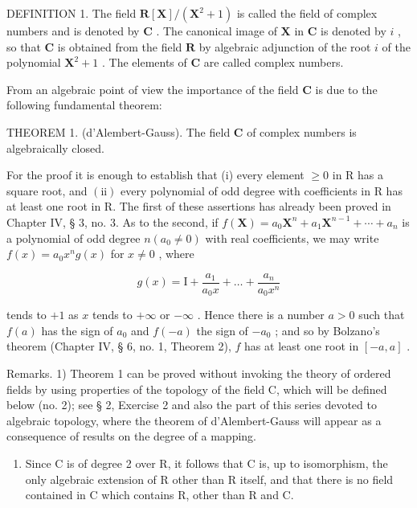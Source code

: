 DEFINITION 1. The field \(\mathbf{R}[\mathbf{X}] / (\mathbf{X}^2 + 1)\) is called the field of complex numbers and is denoted by \(\mathbf{C}\) . The canonical image of \(\mathbf{X}\) in \(\mathbf{C}\) is denoted by \(i\) , so that \(\mathbf{C}\) is obtained from the field \(\mathbf{R}\) by algebraic adjunction of the root \(i\) of the polynomial \(\mathbf{X}^2 + 1\) . The elements of \(\mathbf{C}\) are called complex numbers.

From an algebraic point of view the importance of the field \(\mathbf{C}\) is due to the following fundamental theorem:

THEOREM 1. (d'Alembert-Gauss). The field \(\mathbf{C}\) of complex numbers is algebraically closed.

For the proof it is enough to establish that (i) every element \(\geqslant0\) in R has a square root, and \((\mathrm{ii})\) every polynomial of odd degree with coefficients in R has at least one root in R. The first of these assertions has already been proved in Chapter IV, § 3, no. 3. As to the second, if \(f(\mathbf{X}) = a_{0}\mathbf{X}^{n} + a_{1}\mathbf{X}^{n-1} + \cdots + a_{n}\) is a polynomial of odd degree \(n(a_{0} \neq 0)\) with real coefficients, we may write \(f(x) = a_{0}x^{n}g(x)\) for \(x \neq 0\) , where

\[
g (x) = \mathrm{I} + \frac {a _ {1}}{a _ {0} x} + \dots + \frac {a _ {n}}{a _ {0} x ^ {n}}
\]

tends to \(+1\) as \(x\) tends to \(+\infty\) or \(-\infty\) . Hence there is a number \(a > 0\) such that \(f(a)\) has the sign of \(a_0\) and \(f(-a)\) the sign of \(-a_0\) ;
and so by Bolzano's theorem (Chapter IV, § 6, no. 1, Theorem 2), \(f\) has at least one root in \([-a, a]\) .

Remarks. 1) Theorem 1 can be proved without invoking the theory of ordered fields by using properties of the topology of the field C, which will be defined below (no. 2); see § 2, Exercise 2 and also the part of this series devoted to algebraic topology, where the theorem of d'Alembert-Gauss will appear as a consequence of results on the degree of a mapping.

\begin{enumerate}
\def\labelenumi{\arabic{enumi})}
\setcounter{enumi}{1}
\tightlist
\item
  Since C is of degree 2 over R, it follows that C is, up to isomorphism, the only algebraic extension of R other than R itself, and that there is no field contained in C which contains R, other than R and C.
\end{enumerate}

